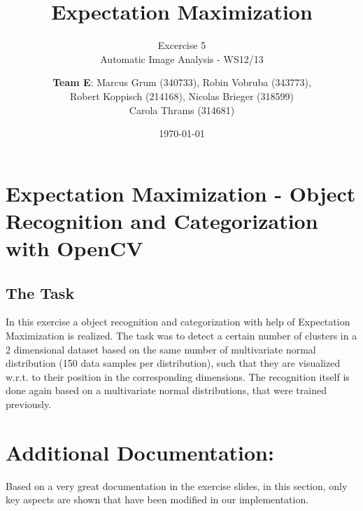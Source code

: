\documentclass[a4paper,headings=small]{scrartcl}
\title{Expectation Maximization}
\subtitle{Excercise 5 \\ Automatic Image Analysis - WS12/13}
\author{\textbf{Team E}: Marcus Grum (340733), Robin Vobruba (343773), \\ Robert Koppisch (214168), Nicolas Brieger (318599)\\Carola Thrams (314681)}
\date{\today}
\numberwithin{equation}{section} %
\numberwithin{figure}{section}   %
\begin{document}
\maketitle

\section{Expectation Maximization - Object Recognition and Categorization with OpenCV}


\subsection{The Task}
In this exercise a object recognition and categorization 
with help of Expectation Maximization is realized.
The task was to detect a certain number of clusters 
in a 2 dimensional dataset based on the same number of multivariate normal distribution
(150 data samples per distribution),
such that they are visualized w.r.t. to their position in the corresponding dimensions.
The recognition itself is done again based on a multivariate normal distributions, 
that were trained previously.

\section{Additional Documentation:}

Based on a very great documentation in the exercise slides,
in this section, only key aspects are shown that have been modified in our implementation.
\end{document}
